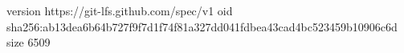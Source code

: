 version https://git-lfs.github.com/spec/v1
oid sha256:ab13dea6b64b727f9f7d1f74f81a327dd041fdbea43cad4bc523459b10906c6d
size 6509
